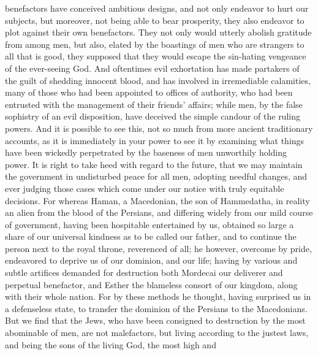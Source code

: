 { benefactors have conceived ambitious designs, and not only endeavor to hurt our subjects, but moreover, not being able to bear prosperity, they also endeavor to plot against their own benefactors. They not only would utterly abolish gratitude from among men, but also, elated by the boastings of men who are strangers to all that is good, they supposed that they would escape the sin-hating vengeance of the ever-seeing God. And oftentimes evil exhortation has made partakers of the guilt of shedding innocent blood, and has involved in irremediable calamities, many of those who had been appointed to offices of authority, who had been entrusted with the management of their friends’ affairs; while men, by the false sophistry of an evil disposition, have deceived the simple candour of the ruling powers. And it is possible to see this, not so much from more ancient traditionary accounts, as it is immediately in your power to see it by examining what things have been wickedly
 perpetrated by the baseness of men unworthily holding power. It is right to take heed with regard to the future, that we may maintain the government in undisturbed peace for all men, adopting needful changes, and ever judging those cases which come under our notice with truly equitable decisions. For whereas Haman, a Macedonian, the son of Hammedatha, in reality an alien from the blood of the Persians, and differing widely from our mild course of government, having been hospitable entertained by us, obtained so large a share of our universal kindness as to be called our father, and to continue the person next to the royal throne, reverenced of all; he however,
 overcome by pride, endeavored to deprive us of our dominion, and our
life; having by various and subtle artifices demanded for destruction both Mordecai our deliverer and perpetual benefactor, and Esther the blameless consort of our kingdom, along with their whole nation. For by these methods he thought, having surprised us in a defenseless state, to transfer the dominion of the Persians to the Macedonians. But we find that the Jews, who have been consigned to destruction by the
 most abominable of men, are not malefactors, but living according to the justest laws, and being the sons of the living God, the most high and
}
